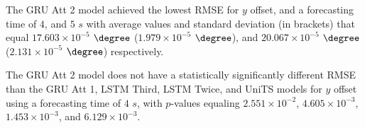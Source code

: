 \begin{table}[!ht]
	\centering
	\caption{The average RMSE ($\times 10^{-4}$), with standard deviation in brackets, across $k$-fold validation datasets for the $y$ offset estimated on the $k$-fold testing datasets by different RNN models, and forecasting times.}
	\label{tab:best_latitude_no_abs_RMSE}
\end{table}

The GRU Att 2 model achieved the lowest RMSE for $y$ offset, and a forecasting time of $4$, and $5$ $s$ with average values and standard deviation (in brackets) that equal $17.603 \times 10^{-5}$ $\degree$ ($1.979 \times 10^{-5}$ $\degree$), and $20.067 \times 10^{-5}$ $\degree$ ($2.131 \times 10^{-5}$ $\degree$) respectively.

The GRU Att 2 model does not have a statistically significantly different RMSE than the GRU Att 1, LSTM Third, LSTM Twice, and UniTS models for $y$ offset using a forecasting time of $4$ $s$, with $p$-values equaling $2.551 \times 10^{-2}$, $4.605 \times 10^{-3}$, $1.453 \times 10^{-3}$, and $6.129 \times 10^{-3}$.

